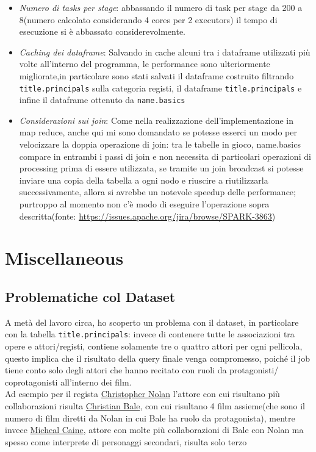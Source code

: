 \documentclass[hidelinks]{article}
\begin{document}
\begin{itemize}
	\begin{itemize}
		\item \textit{Numero di tasks per stage}: abbassando il numero di task per stage da 200 a 8(numero calcolato considerando 4 cores per 2 executors) il tempo di esecuzione si è abbassato considerevolmente.
		
			\item \textit{Caching dei dataframe}: Salvando in cache alcuni tra i dataframe utilizzati più volte all'interno del programma, le performance sono ulteriormente migliorate,in particolare sono stati salvati il dataframe costruito filtrando \texttt{title.principals} sulla categoria registi, il dataframe \texttt{title.principals} e infine il dataframe ottenuto da \texttt{name.basics}
			
			\item \textit{Considerazioni sui join}: Come nella realizzazione dell'implementazione in map reduce, anche qui mi sono domandato se potesse esserci un modo per velocizzare la doppia operazione di join: tra le tabelle in gioco, name.basics compare in entrambi i passi di join e non necessita di particolari operazioni di processing prima di essere utilizzata, se tramite un join broadcast si potesse inviare una copia della tabella a ogni nodo e riuscire a riutilizzarla successivamente, allora si avrebbe un notevole speedup delle performance; purtroppo al momento non c'è modo di eseguire l'operazione sopra descritta(fonte: \url{https://issues.apache.org/jira/browse/SPARK-3863})
	\end{itemize}
	
	
\end{itemize}


\section{Miscellaneous}

\subsection{Problematiche col Dataset}
A metà del lavoro circa, ho scoperto un problema con il dataset, in particolare con la tabella \texttt{title.principals}: invece di contenere tutte le associazioni tra opere e attori/registi, contiene solamente tre o quattro attori per ogni pellicola, questo implica che il risultato della query finale venga compromesso, poiché il job tiene conto solo degli attori che hanno recitato con ruoli da protagonisti/ coprotagonisti all'interno dei film.\\
Ad esempio per il regista \href{https://www.imdb.com/name/nm0634240/}{Christopher Nolan} l'attore con cui risultano più collaborazioni risulta \href{https://www.imdb.com/name/nm0000288/}{Christian Bale}, con cui risultano 4 film assieme(che sono il numero di film diretti da Nolan in cui Bale ha ruolo da protagonista), mentre invece \href{https://www.imdb.com/name/nm0000323/}{Micheal Caine}, attore con molte più collaborazioni di Bale con Nolan ma spesso come interprete di personaggi secondari, risulta solo terzo
\end{document}
